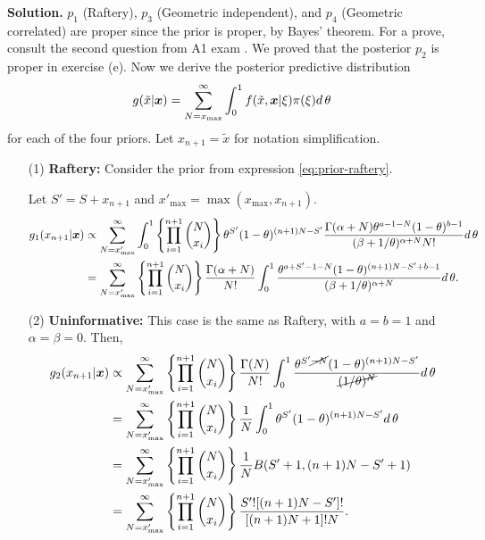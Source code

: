 \vspace{2ex}

    {\bf Solution.} $p_1$ (Raftery), $p_3$ (Geometric independent), and $p_4$
    (Geometric correlated) are proper since the prior is proper, by Bayes'
    theorem. For a prove, consult the second question from A1 exam
    \cite{github}. We proved that the posterior $p_2$ is proper in exercise (e).
    Now we derive the posterior predictive distribution
    $$
    g(\tilde{x}|\boldsymbol{x}) = \sum_{N=x_{\max}}^{\infty} \int_0^1 f(\tilde{x}, \boldsymbol{x}|\xi)\pi(\xi) d \, \theta
    $$
    for each of the four priors. Let $x_{n+1} = \tilde{x}$ for notation simplification.

    \begin{enumerate}
        \item[(1)] {\bf Raftery:} Consider the prior from expression
        \ref{eq:prior-raftery}. 
        
        Let $S' = S + x_{n+1}$ and $x'_{\max} =
        \max(x_{\max}, x_{n+1})$.
        \begin{equation*}
            \begin{split}
                g_1(x_{n+1}|\boldsymbol{x}) &\propto \sum_{N=x'_{\max}}^{\infty} \int_0^1 \left\{\prod_{i=1}^{n+1}\binom{N}{x_i}\right\}\theta^{S'}(1-\theta)^{(n+1)N-S'}\frac{\Gamma(\alpha+N)\theta^{a-1-N}(1-\theta)^{b-1}}{(\beta + 1/\theta)^{\alpha + N}N!} d \, \theta \\
                &= \sum_{N=x'_{\max}}^{\infty} \left\{\prod_{i=1}^{n+1}\binom{N}{x_i}\right\}\frac{\Gamma(\alpha + N)}{N!}\int_0^1 \frac{\theta^{a+S'-1-N}(1-\theta)^{(n+1)N-S'+b-1}}{(\beta + 1/\theta)^{\alpha + N}} d \, \theta. \\
            \end{split}
        \end{equation*} 

        \item[(2)] {\bf Uninformative:} This case is the same as Raftery, with
        $a = b = 1$ and $\alpha = \beta = 0$. Then,
        \begin{equation*}
            \begin{split}
                g_2(x_{n+1}|\boldsymbol{x}) &\propto \sum_{N=x'_{\max}}^{\infty} \left\{\prod_{i=1}^{n+1}\binom{N}{x_i}\right\}\frac{\Gamma(N)}{N!}\int_0^1 \frac{\theta^{S'\cancel{-N}}(1-\theta)^{(n+1)N-S'}}{\cancel{(1/\theta)^{N}}} d \, \theta \\
                &= \sum_{N=x'_{\max}}^{\infty} \left\{\prod_{i=1}^{n+1}\binom{N}{x_i}\right\}\frac{1}{N}\int_0^1 \theta^{S'}(1-\theta)^{(n+1)N-S'} d \, \theta \\
                &= \sum_{N=x'_{\max}}^{\infty} \left\{\prod_{i=1}^{n+1}\binom{N}{x_i}\right\}\frac{1}{N} B(S'+1, (n+1)N-S'+1)\\
                &= \sum_{N=x'_{\max}}^{\infty} \left\{\prod_{i=1}^{n+1}\binom{N}{x_i}\right\}\frac{S'![(n+1)N-S']!}{[(n+1)N+1]! N}.
            \end{split}
        \end{equation*} 


\end{enumerate}
